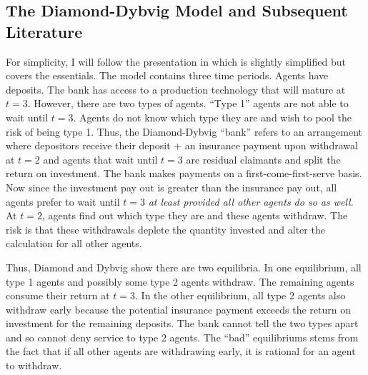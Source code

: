 \documentclass[12pt]{article}
\begin{document}
\begin{doublespace}
\section{The Diamond-Dybvig Model and Subsequent Literature}

For simplicity, I will follow the presentation in \citet{white1999theory} which is slightly simplified but covers the essentials.
The model contains three time periods. Agents have deposits. The bank has access to a production technology that will mature at $t=3$. However, there are two
types of agents. ``Type 1'' agents are not able to wait until $t=3$. Agents do not know which type they are and wish to pool the risk of being type 1. Thus, the
Diamond-Dybvig ``bank'' refers to an arrangement where depositors receive their deposit + an insurance payment upon withdrawal at $t=2$ and agents that wait until
$t=3$ are residual claimants and split the return on investment. The bank makes payments on a first-come-first-serve basis. Now since the investment pay out is greater than the insurance pay out, all agents prefer to wait until $t=3$ \emph{at least provided all other agents do so as well}. At $t=2$, agents find out which type they are and these agents withdraw. The risk is that these withdrawals deplete the quantity invested and alter the calculation for all other agents.

Thus, Diamond and Dybvig show there are two equilibria. In one equilibrium, all type 1 agents and possibly some type 2 agents withdraw. The remaining agents consume their return at $t=3$. In the other equilibrium, all type 2 agents also withdraw early because the potential insurance payment exceeds the return on investment for the remaining deposits. The bank cannot tell the two types apart and so cannot deny service to type 2 agents. The ``bad'' equilibriums stems from the fact that if all other agents are withdrawing early,
it is rational for an agent to withdraw.


\end{doublespace}
\end{document}
